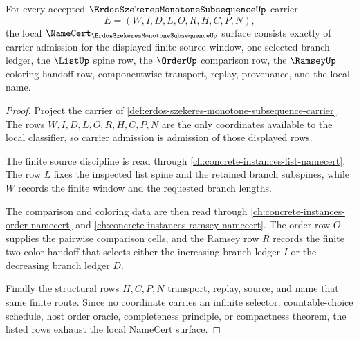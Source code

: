 \begin{theorem}
\label{thm:erdos-szekeres-monotone-subsequence-namecert-surface}
For every accepted $\ErdosSzekeresMonotoneSubsequenceUp$ carrier
$$
E=(W,I,D,L,O,R,H,C,P,N),
$$
the local $\NameCert_{\ErdosSzekeresMonotoneSubsequenceUp}$ surface consists exactly of carrier admission for the displayed finite source window, one selected branch ledger, the $\ListUp$ spine row, the $\OrderUp$ comparison row, the $\RamseyUp$ coloring handoff row, componentwise transport, replay, provenance, and the local name.
\end{theorem}
\begin{proof}
Project the carrier of \autoref{def:erdos-szekeres-monotone-subsequence-carrier}. The rows $W,I,D,L,O,R,H,C,P,N$ are the only coordinates available to the local classifier, so carrier admission is admission of those displayed rows.

The finite source discipline is read through \autoref{ch:concrete-instances-list-namecert}. The row $L$ fixes the inspected list spine and the retained branch subspines, while $W$ records the finite window and the requested branch lengths.

The comparison and coloring data are then read through \autoref{ch:concrete-instances-order-namecert} and \autoref{ch:concrete-instances-ramsey-namecert}. The order row $O$ supplies the pairwise comparison cells, and the Ramsey row $R$ records the finite two-color handoff that selects either the increasing branch ledger $I$ or the decreasing branch ledger $D$.

Finally the structural rows $H,C,P,N$ transport, replay, source, and name that same finite route. Since no coordinate carries an infinite selector, countable-choice schedule, host order oracle, completeness principle, or compactness theorem, the listed rows exhaust the local NameCert surface.
\end{proof}

